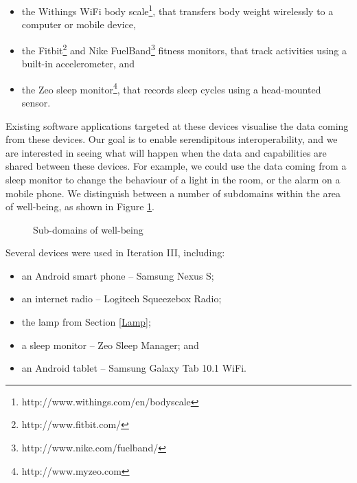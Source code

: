 \begin{itemize}
	\item the Withings WiFi body scale\footnote{http://www.withings.com/en/bodyscale}, that transfers body weight wirelessly to a computer or mobile device,
  	\item the Fitbit\footnote{http://www.fitbit.com/} and Nike FuelBand\footnote{http://www.nike.com/fuelband/} fitness monitors, that track activities using a built-in accelerometer, and
	\item the Zeo sleep monitor\footnote{http://www.myzeo.com}, that records sleep cycles using a head-mounted sensor.
\end{itemize}
 

Existing software applications targeted at these devices visualise the data coming from these devices. Our goal is to enable serendipitous interoperability, and we are interested in seeing what will happen when the data and capabilities are shared between these devices. For example, we could use the data coming from a sleep monitor to change the behaviour of a light in the room, or the alarm on a mobile phone. We distinguish between a number of subdomains within the area of well-being, as shown in Figure \ref{Wellbeing}.

\begin{figure}[bth]
\begin{center}
	\caption{Sub-domains of well-being}
	\label{Wellbeing}        
\end{center}
\end{figure}

Several devices were used in Iteration III, including:

\begin{itemize}
	\item an Android smart phone -- Samsung Nexus S;
	\item an internet radio -- Logitech Squeezebox Radio;
	\item the lamp from Section \ref{Lamp};
	\item a sleep monitor -- Zeo Sleep Manager; and 
	\item an Android tablet -- Samsung Galaxy Tab 10.1 WiFi.
\end{itemize}

